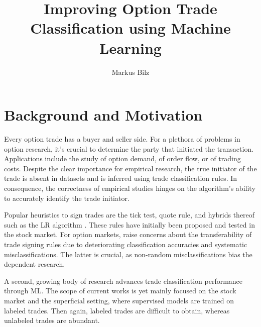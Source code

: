 \documentclass[oneside,a4paper,10pt]{article} %
\newcommand{\name}{Markus Bilz} %
\newcommand{\titleofthesis}{Improving Option Trade Classification using Machine Learning} %
\begin{document}
\title{\vspace{-2.5cm}\titleofthesis}
\author{\name}
\date{}
\maketitle


% 

\section{Background and Motivation}

Every option trade has a buyer and seller side. For a plethora of problems in option research, it’s crucial to determine the party that initiated the transaction. Applications include the study of option demand, of order flow, or of trading costs. Despite the clear importance for empirical research, the true initiator of the trade is absent in datasets and is inferred using trade classification rules. In consequence, the correctness of empirical studies hinges on the algorithm's ability to accurately identify the trade initiator.

Popular heuristics to sign trades are the tick test, quote rule, and hybrids thereof such as the \gls{LR} algorithm \autocite[][]{leeInferringTradeDirection1991}.
These rules have initially been proposed and tested in the stock market. For option markets, \textcites[][]{savickasInferringDirectionOption2003}[][]{grauerOptionTradeClassification2022} raise concerns about the transferability of trade signing rules due to deteriorating classification accuracies and systematic misclassifications. The latter is crucial, as non-random misclassifications bias the dependent research.%

A second, growing body of research \autocites{blazejewskiLocalNonParametricModel2005}{rosenthalModelingTradeDirection2012}{ronenMachineLearningTrade2022} advances trade classification performance through \gls{ML}. The scope of current works is yet mainly focused on the stock market and the superficial setting, where supervised models are trained on labeled trades. Then again, labeled trades are difficult to obtain, whereas unlabeled trades are abundant.
\end{document}
